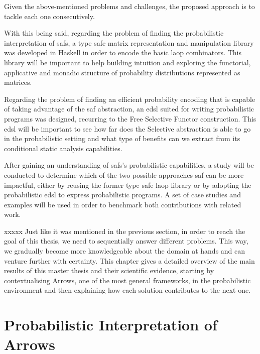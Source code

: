 \documentclass[
  oneside,
  11pt, a4paper,
  footinclude=true,
  headinclude=true,
  cleardoublepage=empty
]{scrbook}
\theoremstyle{definition}
\theoremstyle{definition}
\begin{document}
	Given the above-mentioned problems and challenges, the proposed approach is to tackle each one consecutively.
	
	With this being said, regarding the problem of finding the probabilistic interpretation of \glspl{saf}, a type safe matrix representation and manipulation library was developed in Haskell in order to encode the basic \gls{laop} combinators. This library will be important to help building intuition and exploring the functorial, applicative and monadic structure of probability distributions represented as matrices.
	
	Regarding the problem of finding an efficient probability encoding that is capable of taking advantage of the \gls{saf} abstraction, an \gls{edsl} suited for writing probabilistic programs was designed, recurring to the Free Selective Functor construction. This \gls{edsl} will be important to see how far does the Selective abstraction is able to go in the probabilistic setting and what type of benefits can we extract from its conditional static analysis capabilities.
	
    After gaining an understanding of \glspl{saf}'s probabilistic capabilities, a study will be conducted to determine which of the two possible approaches \gls{saf} can be more impactful, either by reusing the former type safe \gls{laop} library or by adopting the probabilistic \gls{edsl} to express probabilistic programs. A set of case studies and examples will be used in order to benchmark both contributions with related work.
	
	    xxxxx Just like it was mentioned in the previous section, in order to reach the goal of this thesis, we need to sequentially answer different problems. This way, we gradually become more knowledgeable about the domain at hands and can venture further with certainty. This chapter gives a detailed overview of the main results of this master thesis and their scientific evidence, starting by contextualising Arrows, one of the most general frameworks, in the probabilistic environment and then explaining how each solution contributes to the next one.
	    
	    \section{Probabilistic Interpretation of Arrows}
	    
\end{document}
